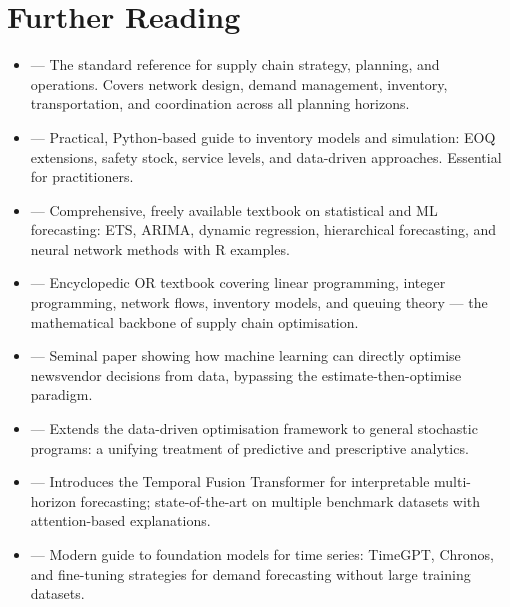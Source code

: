 \section{Further Reading}

\begin{tcbitemize}[ skin=sectionraster ]
    \tcbitem[title=Recommended Sources for AI in Supply Chain Management, raster multicolumn=6]
    \begin{itemize}
        \item {} --- The standard reference for supply chain strategy, planning, and operations. Covers network design, demand management, inventory, transportation, and coordination across all planning horizons.
        \item {} --- Practical, Python-based guide to inventory models and simulation: EOQ extensions, safety stock, service levels, and data-driven approaches. Essential for practitioners.
        \item {} --- Comprehensive, freely available textbook on statistical and ML forecasting: ETS, ARIMA, dynamic regression, hierarchical forecasting, and neural network methods with R examples.
        \item {} --- Encyclopedic OR textbook covering linear programming, integer programming, network flows, inventory models, and queuing theory --- the mathematical backbone of supply chain optimisation.
        \item {} --- Seminal paper showing how machine learning can directly optimise newsvendor decisions from data, bypassing the estimate-then-optimise paradigm.
        \item {} --- Extends the data-driven optimisation framework to general stochastic programs: a unifying treatment of predictive and prescriptive analytics.
        \item {} --- Introduces the Temporal Fusion Transformer for interpretable multi-horizon forecasting; state-of-the-art on multiple benchmark datasets with attention-based explanations.
        \item {} --- Modern guide to foundation models for time series: TimeGPT, Chronos, and fine-tuning strategies for demand forecasting without large training datasets.
    \end{itemize}
\end{tcbitemize}
